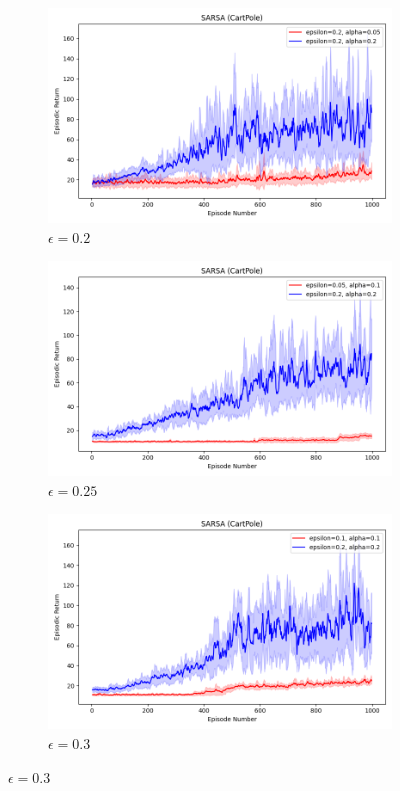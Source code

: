 \documentclass[11pt, a4]{article}
\begin{document}
\begin{figure}[h]
				\begin{subfigure}[h]{0.3\textwidth}
					\centering
					\includegraphics[width=\textwidth]{../cartpole-v1/plots/sarsa_0.05_0.2vs0.2_0.2.png}
					\caption{$\epsilon = 0.2$}
				\end{subfigure}
				\hfill
				\begin{subfigure}[h]{0.3\textwidth}
					\centering
					\includegraphics[width=\textwidth]{../cartpole-v1/plots/sarsa_0.1_0.05vs0.2_0.2.png}
					\caption{$\epsilon = 0.25$}
				\end{subfigure}
				\hfill
				\begin{subfigure}[h]{0.3\textwidth}
					\centering
					\includegraphics[width=\textwidth]{../cartpole-v1/plots/sarsa_0.1_0.1vs0.2_0.2.png}
					\caption{$\epsilon = 0.3$}
				\end{subfigure}
				

\end{figure}
\end{document}
